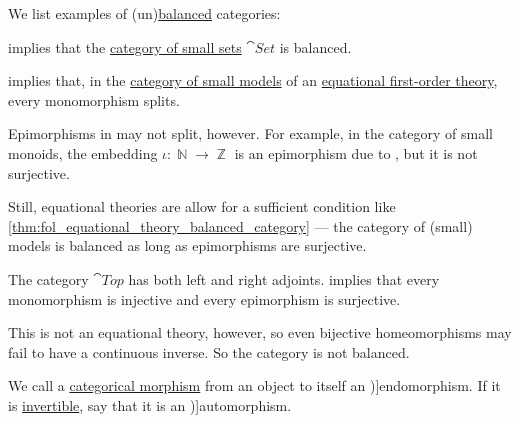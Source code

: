 \begin{example}\label{ex:def:balanced_category}
  We list examples of (un)\hyperref[def:balanced_category]{balanced} categories:
  \begin{thmenum}
      implies that the \hyperref[def:category_of_small_sets]{category of small sets} \( \cat{Set} \) is balanced.

      implies that, in the \hyperref[def:fol_theory_model_functor/obj]{category of small models} of an \hyperref[def:fol_equational_theory]{equational first-order theory}, every monomorphism splits.

    Epimorphisms in may not split, however. For example, in the category of small monoids, the embedding \( \iota: \BbbN \to \BbbZ \) is an epimorphism due to , but it is not surjective.

    Still, equational theories are allow for a sufficient condition like \cref{thm:fol_equational_theory_balanced_category} --- the category of (small) models is balanced as long as epimorphisms are surjective.

     The category \hyperref[def:category_of_small_topological_spaces]{\( \cat{Top} \)} has both left and right adjoints.  implies that every monomorphism is injective and every epimorphism is surjective.

    This is not an equational theory, however, so even bijective homeomorphisms may fail to have a continuous inverse. So the category is not balanced.
  \end{thmenum}
\end{example}

\begin{definition}\label{def:categorical_endomorphism}
  We call a \hyperref[def:category/morphisms]{categorical morphism} from an object to itself an \term[ru=эндоморфизм (\cite[42]{Хелемский2014ФункциональныйАнализ})]{endomorphism}. If it is \hyperref[def:morphism_invertibility/isomorphism]{invertible}, say that it is an \term[ru=автоморфизм (\cite[50]{Хелемский2014ФункциональныйАнализ})]{automorphism}.
\end{definition}

